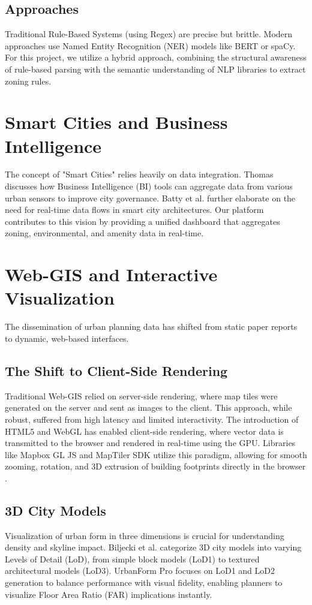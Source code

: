 \documentclass[12pt,a4paper]{report}
\begin{document}
\subsection{Approaches}
Traditional Rule-Based Systems (using Regex) are precise but brittle. Modern approaches use Named Entity Recognition (NER) models like BERT or spaCy. For this project, we utilize a hybrid approach, combining the structural awareness of rule-based parsing with the semantic understanding of NLP libraries to extract zoning rules.

\section{Smart Cities and Business Intelligence}
The concept of "Smart Cities" relies heavily on data integration. Thomas \cite{thomas2016business} discusses how Business Intelligence (BI) tools can aggregate data from various urban sensors to improve city governance. Batty et al. \cite{batty2012smart} further elaborate on the need for real-time data flows in smart city architectures. Our platform contributes to this vision by providing a unified dashboard that aggregates zoning, environmental, and amenity data in real-time.

\section{Web-GIS and Interactive Visualization}
The dissemination of urban planning data has shifted from static paper reports to dynamic, web-based interfaces. 

\subsection{The Shift to Client-Side Rendering}
Traditional Web-GIS relied on server-side rendering, where map tiles were generated on the server and sent as images to the client. This approach, while robust, suffered from high latency and limited interactivity. The introduction of HTML5 and WebGL has enabled client-side rendering, where vector data is transmitted to the browser and rendered in real-time using the GPU. Libraries like Mapbox GL JS and MapTiler SDK utilize this paradigm, allowing for smooth zooming, rotation, and 3D extrusion of building footprints directly in the browser \cite{li2020webgl}.

\subsection{3D City Models}
Visualization of urban form in three dimensions is crucial for understanding density and skyline impact. Biljecki et al. \cite{biljecki2015applications} categorize 3D city models into varying Levels of Detail (LoD), from simple block models (LoD1) to textured architectural models (LoD3). UrbanForm Pro focuses on LoD1 and LoD2 generation to balance performance with visual fidelity, enabling planners to visualize Floor Area Ratio (FAR) implications instantly.
\end{document}
